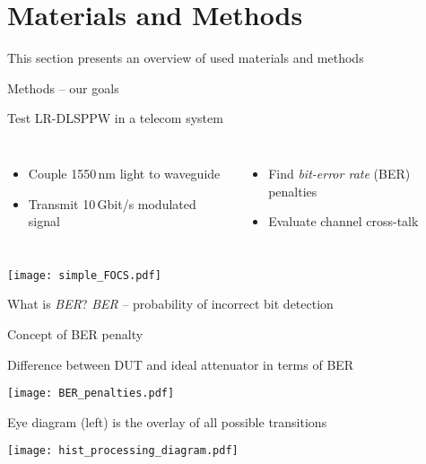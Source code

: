 \section{Materials and Methods}
  This section presents an overview of used materials and methods
  \begin{frame}{Methods -- our goals}
    \begin{block}{Test LR-DLSPPW in a telecom system}
    \begin{columns}
        \begin{itemize}
          \item Couple 1550\,nm light to waveguide
          \item Transmit 10\,Gbit/s modulated signal
        \end{itemize}
        \begin{itemize}
          \item Find \emph{bit-error rate} (BER) penalties
          \item Evaluate channel cross-talk
        \end{itemize}
    \end{columns}
    \vspace{2mm}
        \begin{center}
          \texttt{[image: simple\_FOCS.pdf]}
        \end{center}
    \end{block}
      \begin{exampleblock}{What is \emph{BER}?}
        \emph{BER} -- probability of incorrect bit detection\\
      \end{exampleblock}

  \end{frame}

  
  \begin{frame}{Concept of BER penalty}
    \begin{block}{Difference between DUT and ideal attenuator in terms of BER}
      \begin{center}
      \end{center}
    \end{block}
    \begin{center}
     \texttt{[image: BER\_penalties.pdf]}
    \end{center}

    Eye diagram (left) is the overlay of all possible transitions
    \begin{center}
      \texttt{[image: hist\_processing\_diagram.pdf]}
    \end{center}
  \end{frame}


